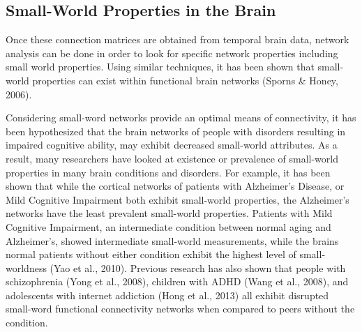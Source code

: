 \documentclass[11pt,letterpaper,doublespacing,titlepage]{article}
\begin{document}
\subsection{Small-World Properties in the Brain}
\par
Once these connection matrices are obtained from temporal brain data, network analysis can be done in order to look for specific network properties including small world properties. Using similar techniques, it has been shown that small-world properties can exist within functional brain networks (Sporns \& Honey, 2006). 
\par
Considering small-word networks provide an optimal means of connectivity, it has been hypothesized that the brain networks of people with disorders resulting in impaired cognitive ability, may exhibit decreased small-world attributes. As a result, many researchers have looked at existence or prevalence of small-world properties in many brain conditions and disorders. For example, it has been shown that while the cortical networks of patients with Alzheimer’s Disease, or Mild Cognitive Impairment both exhibit small-world properties, the Alzheimer’s networks have the least prevalent small-world properties. Patients with Mild Cognitive Impairment, an intermediate condition between normal aging and Alzheimer’s, showed intermediate small-world measurements, while the brains normal patients without either condition exhibit the highest level of small-worldness (Yao et al., 2010).  Previous research has also shown that people with schizophrenia (Yong et al., 2008), children with ADHD (Wang et al., 2008), and adolescents with internet addiction (Hong et al., 2013) all exhibit disrupted small-word functional connectivity networks when compared to peers without the condition.
\end{document}
